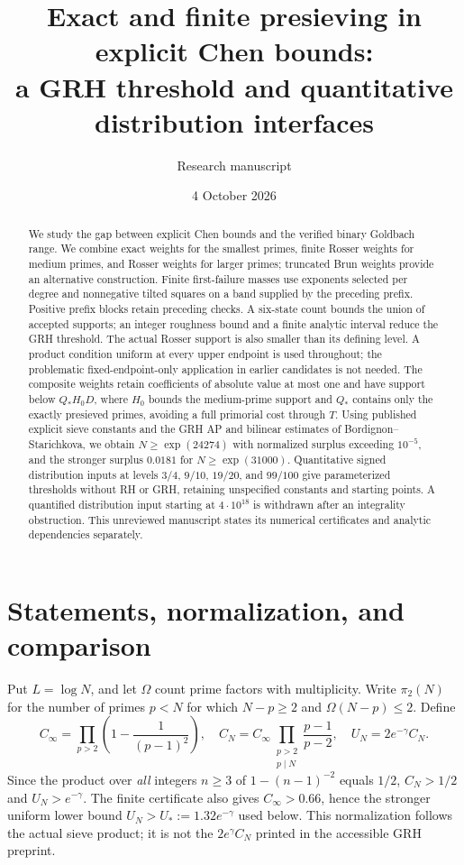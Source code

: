 \documentclass[11pt]{article}
\title{Exact and finite presieving in explicit Chen bounds:\\a GRH threshold and quantitative distribution interfaces}
\author{Research manuscript}
\date{4 October 2026}
\begin{document}
\maketitle
\begin{abstract}
We study the gap between explicit Chen bounds and the verified binary
Goldbach range. We combine exact weights for the smallest primes,
finite Rosser weights for medium primes, and Rosser weights for larger
primes; truncated Brun weights provide an alternative construction.
Finite first-failure masses use exponents selected per degree and
nonnegative tilted squares on a band supplied by the preceding prefix.
Positive prefix blocks retain preceding checks. A six-state count
bounds the union of accepted supports; an integer roughness bound
and a finite analytic interval reduce the GRH threshold.
The actual Rosser support is also smaller than its defining level.
A product condition uniform at every
upper endpoint is used throughout; the problematic fixed-endpoint-only
application in earlier candidates is not needed. The composite weights
retain coefficients of absolute value at most one and have support
below $Q_*H_0D$, where $H_0$ bounds the medium-prime support and
$Q_*$ contains only the exactly presieved primes,
avoiding a full primorial cost through $T$. Using published
explicit sieve constants and the GRH AP and bilinear estimates of
Bordignon--Starichkova, we obtain $N\ge\exp(24274)$ with normalized
surplus exceeding $10^{-5}$, and the stronger surplus $0.0181$
for $N\ge\exp(31000)$. Quantitative signed distribution inputs at levels
$3/4$, $9/10$, $19/20$, and $99/100$ give parameterized thresholds
without RH or GRH, retaining unspecified constants and starting points.
A quantified distribution input starting at $4\cdot10^{18}$ is
withdrawn after an integrality obstruction. This unreviewed manuscript
states its numerical certificates and analytic dependencies separately.
\end{abstract}

\section{Statements, normalization, and comparison}
Put $L=\log N$, and let $\Omega$ count prime factors with multiplicity.
Write $\pi_2(N)$ for the number of primes $p<N$ for which
$N-p\ge2$ and $\Omega(N-p)\le2$. Define
\[
C_\infty=\prod_{p>2}\left(1-\frac1{(p-1)^2}\right),\quad
C_N=C_\infty\prod_{\substack{p>2\\p\mid N}}\frac{p-1}{p-2},\quad
U_N=2e^{-\gamma}C_N.
\]
Since the product over \emph{all} integers $n\ge3$ of
$1-(n-1)^{-2}$ equals $1/2$, $C_N>1/2$ and $U_N>e^{-\gamma}$.
The finite certificate also gives $C_\infty>0.66$, hence the stronger
uniform lower bound $U_N>U_*:=1.32e^{-\gamma}$ used below.
This normalization follows the actual sieve product; it is not the
$2e^{\gamma}C_N$ printed in the accessible GRH preprint.
\end{document}

